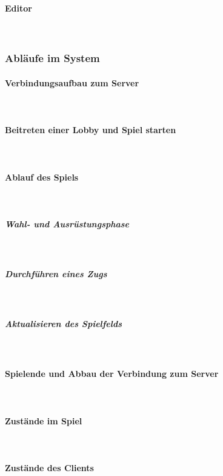 \documentclass{uulm-assignment}
\begin{document}
\paragraph{Editor} \mbox{}\\


\clearpage
\subsubsection{Abläufe im System}
\paragraph{Verbindungsaufbau zum Server}
\label{connect} \mbox{}\\

\paragraph{Beitreten einer Lobby und Spiel starten} \mbox{}\\
\label{Sequ_Lobby}

\paragraph{Ablauf des Spiels} \mbox{}\\
\subparagraph{Wahl- und Ausrüstungsphase} \mbox{}\\

\subparagraph{Durchführen eines Zugs} \mbox{}\\

\subparagraph{Aktualisieren des Spielfelds} \mbox{}\\

\paragraph{Spielende und Abbau der Verbindung zum Server} \mbox{}\\
\label{Sequ_Winner}

\paragraph{Zustände im Spiel} \mbox{}\\

\paragraph{Zustände des Clients} \mbox{}\\

\end{document}
